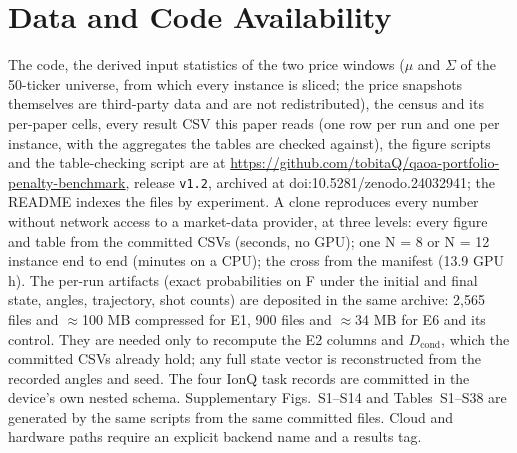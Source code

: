 \documentclass{ieeeaccess}
\begin{document}
\section*{Data and Code Availability}

The code, the derived input statistics of the two price windows ($\mu$ and $\Sigma$ of the 50-ticker universe, from which every instance is sliced; the price snapshots themselves are third-party data and are not redistributed), the census and its per-paper cells, every result CSV this paper reads (one row per run and one per instance, with the aggregates the tables are checked against), the figure scripts and the table-checking script are at \url{https://github.com/tobitaQ/qaoa-portfolio-penalty-benchmark}, release \texttt{v1.2}, archived at doi:10.5281/zenodo.24032941; the README indexes the files by experiment. A clone reproduces every number without network access to a market-data provider, at three levels: every figure and table from the committed CSVs (seconds, no GPU); one N = 8 or N = 12 instance end to end (minutes on a CPU); the cross from the manifest (13.9 GPU h). The per-run artifacts (exact probabilities on F under the initial and final state, angles, trajectory, shot counts) are deposited in the same archive: 2,565 files and $\approx$100 MB compressed for E1, 900 files and $\approx$34 MB for E6 and its control. They are needed only to recompute the E2 columns and $D_{\mathrm{cond}}$, which the committed CSVs already hold; any full state vector is reconstructed from the recorded angles and seed. The four IonQ task records are committed in the device's own nested schema. Supplementary Figs.~S1--S14 and Tables~S1--S38 are generated by the same scripts from the same committed files. Cloud and hardware paths require an explicit backend name and a results tag.
\end{document}

